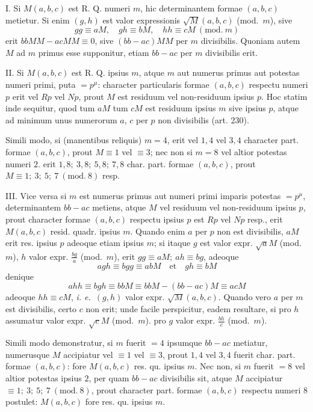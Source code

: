 \par
{}
I. Si $M(a,b,c)$ est R. Q. numeri $m$, hic determinantem formae $(a,b,c)$ metietur. Si enim $(g,h)$ est valor expressionis $\surd M(a,b,c)$ (mod.\ $m$), sive
\[
gg\equiv aM,\quad gh\equiv bM,\quad hh\equiv cM\ (\mathrm{mod.}\ m)
\]
erit $bbMM-acMM\equiv0$, sive $(bb-ac)MM$ per $m$ divisibilis. Quoniam autem $M$ ad $m$ primus esse supponitur, etiam $bb-ac$ per $m$ divisibilis erit.

II. Si $M(a,b,c)$ est R. Q. ipsius $m$, atque $m$ aut numerus primus aut potestas numeri primi, puta $=p^\mu$: character particularis formae $(a,b,c)$ respectu numeri $p$ erit vel $Rp$ vel $Np$, prout $M$ est residuum vel non-residuum ipsius $p$. Hoc statim inde sequitur, quod tum $aM$ tum $cM$ est residuum ipsius $m$ sive ipsius $p$, atque ad minimum unus numerorum $a$, $c$ per $p$ non divisibilis (art. 230).

Simili modo, si (manentibus reliquis) $m=4$, erit vel $1,4$ vel $3,4$ character part. formae $(a,b,c)$, prout $M\equiv1$ vel $\equiv3$; nec non si $m=8$ vel altior potestas numeri $2$. erit $1,8;\ 3,8;\ 5,8;\ 7,8$ char. part. formae $(a,b,c)$, prout $M\equiv1;\ 3;\ 5;\ 7\ (\mathrm{mod.}\ 8)$ resp.

III. Vice versa si $m$ est numerus primus aut numeri primi imparis potestas $=p^\mu$, determinantem $bb-ac$ metiens, atque $M$ vel residuum vel non-residuum ipsius $p$, prout character formae $(a,b,c)$ respectu ipsius $p$ est $Rp$ vel $Np$ resp., erit $M(a,b,c)$ resid. quadr. ipsius $m$. Quando enim $a$ per $p$ non est divisibilis, $aM$ erit res. ipsius $p$ adeoque etiam ipsius $m$; si itaque $g$ est valor expr. $\surd aM$ (mod.\ $m$), $h$ valor expr. $\frac{bg}{a}$ (mod.\ $m$), erit $gg\equiv aM;\ ah\equiv bg$, adeoque
\[
agh\equiv bgg\equiv abM\quad\text{et}\quad gh\equiv bM
\]
denique
\[
ahh\equiv bgh\equiv bbM\equiv bbM-(bb-ac)M\equiv acM
\]
adeoque $hh\equiv cM$, \textit{i. e.}\ $(g,h)$ valor expr. $\surd M(a,b,c)$. Quando vero $a$ per $m$ est divisibilis, certo $c$ non erit; unde facile perspicitur, eadem resultare, si pro $h$ assumatur valor expr. $\surd cM$ (mod.\ $m$). pro $g$ valor expr. $\frac{bh}{c}$ (mod.\ $m$).

Simili modo demonstratur, si $m$ fuerit $=4$ ipsumque $bb-ac$ metiatur, numerusque $M$ accipiatur vel $\equiv1$ vel $\equiv3$, prout $1,4$ vel $3,4$ fuerit char. part.
formae $(a,b,c)$: fore $M(a,b,c)$ res. qu. ipsius $m$. Nec non, si $m$ fuerit $=8$ vel altior potestas ipsius $2$, per quam $bb-ac$ divisibilis sit, atque $M$ accipiatur $\equiv1;\ 3;\ 5;\ 7\ (\mathrm{mod.}\ 8)$, prout character part. formae $(a,b,c)$ respectu numeri $8$ postulet: $M(a,b,c)$ fore res. qu. ipsius $m$.

